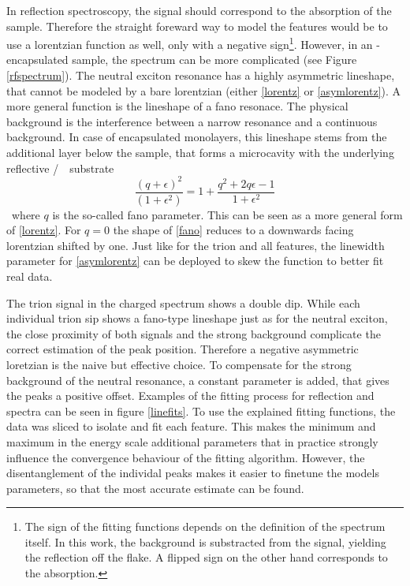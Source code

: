 In reflection spectroscopy, the signal should correspond to the absorption of the sample. Therefore the straight foreward way to model the features would be to use a lorentzian function as well, only with a negative sign\footnote{The sign of the fitting functions depends on the definition of the spectrum itself. In this work, the background is substracted from the signal, yielding the reflection off the flake. A flipped sign on the other hand corresponds to the absorption.}. However, in an \hbn-encapsulated sample, the spectrum can be more complicated (see Figure \ref{rfspectrum}). The neutral exciton resonance has a highly asymmetric lineshape, that cannot be modeled by a bare lorentzian (either \eqref{lorentz} or \eqref{asymlorentz}). A more general function is the lineshape of a fano resonace. The physical background is the interference between a narrow resonance and a continuous background\cite{fano_effects_1961}. In case of encapsulated \tmdg monolayers, this lineshape stems from the additional \hbng layer below the sample, that forms a microcavity with the underlying reflective \si/\sio substrate\cite{scuri_large_2018}.
\begin{equation}
\frac{(q+\epsilon)^2}{(1+\epsilon^2)} = 1 + \frac{q^2+2q\epsilon-1}{1+\epsilon^2}\label{fano}
\end{equation}
where $q$ is the so-called fano parameter. This can be seen as a more general form of \eqref{lorentz}. For $q=0$ the shape of \eqref{fano} reduces to a downwards facing lorentzian shifted by one. Just like for the trion and all \pl features, the linewidth parameter for \eqref{asymlorentz} can be deployed to skew the function to better fit real data.

The trion signal in the charged spectrum shows a double dip. While each individual trion sip shows a fano-type lineshape just as for the neutral exciton, the close proximity of both signals and the strong background complicate the correct estimation of the peak position. Therefore a negative asymmetric loretzian is the naive but effective choice. To compensate for the strong background of the neutral resonance, a constant parameter is added, that gives the peaks a positive offset. 
Examples of the fitting process for reflection and \pl spectra can be seen in figure \ref{linefits}. To use the explained fitting functions, the data was sliced to isolate and fit each feature. This makes the minimum and maximum in the energy scale additional parameters that in practice strongly influence the convergence behaviour of the fitting algorithm. However, the disentanglement of the individal peaks makes it easier to finetune the models parameters, so that the most accurate estimate can be found.

